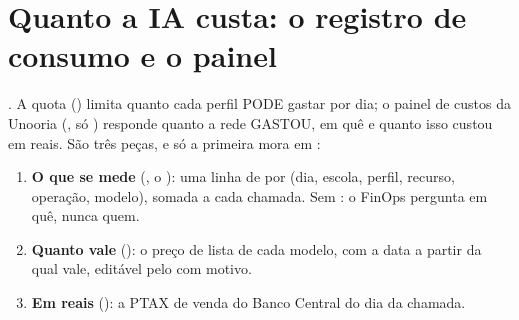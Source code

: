 \section{Quanto a IA custa: o registro de consumo e o painel}
\label{sec:ia-custos}

. A quota () limita
quanto cada perfil PODE gastar por dia; o painel de custos da Unooria
(, só ) responde quanto a rede GASTOU, em
quê e quanto isso custou em reais. São três peças, e só a primeira mora em
:

\begin{enumerate}
  \item \textbf{O que se mede} (, o
    ): uma linha de  por (dia,
    escola, perfil, recurso, operação, modelo), somada a cada chamada. Sem
    : o FinOps pergunta em quê, nunca quem.
  \item \textbf{Quanto vale} (): o preço de lista de cada modelo,
    com a data a partir da qual vale, editável pelo  com motivo.
  \item \textbf{Em reais} (): a PTAX de venda do Banco
    Central do dia da chamada.
\end{enumerate}

